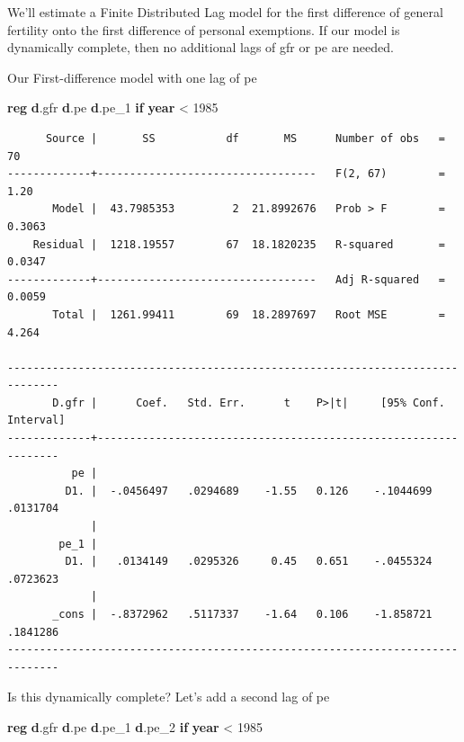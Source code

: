 \documentclass[
]{book}
\newenvironment{Shaded}{\begin{snugshade}}{\end{snugshade}}
\newcommand{\FunctionTok}[1]{\textcolor[rgb]{0.13,0.29,0.53}{\textbf{#1}}}
\newcommand{\KeywordTok}[1]{\textcolor[rgb]{0.13,0.29,0.53}{\textbf{#1}}}
\newcommand{\NormalTok}[1]{#1}
\begin{document}
We'll estimate a Finite Distributed Lag model for the first difference of
general fertility onto the first difference of personal exemptions.
If our model is dynamically complete, then no additional lags of gfr or pe
are needed.

Our First-difference model with one lag of pe

\begin{Shaded}
\begin{Highlighting}[]
\KeywordTok{reg} \KeywordTok{d}\NormalTok{.gfr }\KeywordTok{d}\NormalTok{.pe }\KeywordTok{d}\NormalTok{.pe\_1 }\KeywordTok{if} \FunctionTok{year}\NormalTok{ \textless{} 1985}
\end{Highlighting}
\end{Shaded}

\begin{verbatim}
      Source |       SS           df       MS      Number of obs   =        70
-------------+----------------------------------   F(2, 67)        =      1.20
       Model |  43.7985353         2  21.8992676   Prob > F        =    0.3063
    Residual |  1218.19557        67  18.1820235   R-squared       =    0.0347
-------------+----------------------------------   Adj R-squared   =    0.0059
       Total |  1261.99411        69  18.2897697   Root MSE        =     4.264

------------------------------------------------------------------------------
       D.gfr |      Coef.   Std. Err.      t    P>|t|     [95% Conf. Interval]
-------------+----------------------------------------------------------------
          pe |
         D1. |  -.0456497   .0294689    -1.55   0.126    -.1044699    .0131704
             |
        pe_1 |
         D1. |   .0134149   .0295326     0.45   0.651    -.0455324    .0723623
             |
       _cons |  -.8372962   .5117337    -1.64   0.106    -1.858721    .1841286
------------------------------------------------------------------------------
\end{verbatim}

Is this dynamically complete? Let's add a second lag of pe

\begin{Shaded}
\begin{Highlighting}[]
\KeywordTok{reg} \KeywordTok{d}\NormalTok{.gfr }\KeywordTok{d}\NormalTok{.pe }\KeywordTok{d}\NormalTok{.pe\_1 }\KeywordTok{d}\NormalTok{.pe\_2 }\KeywordTok{if} \FunctionTok{year}\NormalTok{ \textless{} 1985}
\end{Highlighting}
\end{Shaded}
\end{document}
